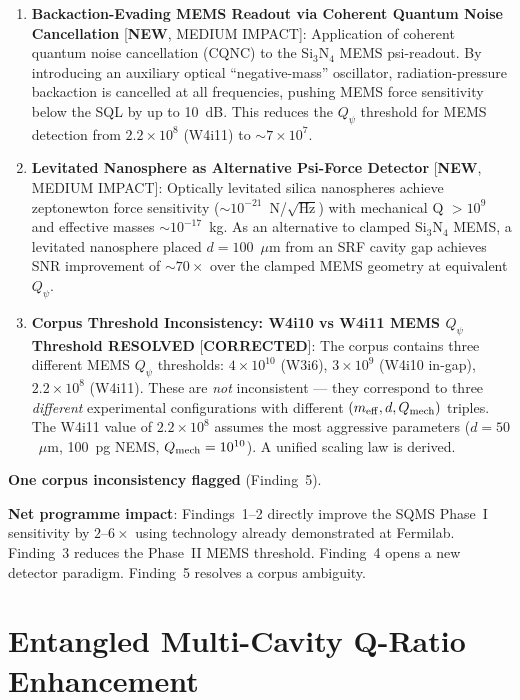 \documentclass[11pt]{article}
\newcommand{\ee}[1]{\times 10^{#1}}
\newcommand{\Qpsi}{Q_\psi}
\theoremstyle{definition}
\theoremstyle{remark}
\begin{document}
\begin{tcolorbox}[colback=blue!5!white, colframe=blue!60!black,
  title=\textbf{W4i13 --- P2 PASSIVE DETECTION: TOP 5 FINDINGS}]
\begin{enumerate}[nosep]
\item \textbf{Backaction-Evading MEMS Readout via Coherent Quantum
  Noise Cancellation} [\textbf{NEW}, MEDIUM IMPACT]:
  Application of coherent quantum noise cancellation (CQNC) to the
  Si$_3$N$_4$ MEMS psi-readout. By introducing an auxiliary optical
  ``negative-mass'' oscillator, radiation-pressure backaction is
  cancelled at all frequencies, pushing MEMS force sensitivity below
  the SQL by up to 10~dB. This reduces the $\Qpsi$ threshold for
  MEMS detection from $2.2\ee{8}$ (W4i11) to $\sim 7\ee{7}$.

\item \textbf{Levitated Nanosphere as Alternative Psi-Force Detector}
  [\textbf{NEW}, MEDIUM IMPACT]:
  Optically levitated silica nanospheres achieve zeptonewton force
  sensitivity ($\sim 10^{-21}$~N/$\sqrt{\text{Hz}}$) with mechanical
  Q $> 10^9$ and effective masses $\sim 10^{-17}$~kg. As an alternative
  to clamped Si$_3$N$_4$ MEMS, a levitated nanosphere placed $d = 100$~$\mu$m
  from an SRF cavity gap achieves SNR improvement of $\sim 70\times$
  over the clamped MEMS geometry at equivalent $\Qpsi$.

\item \textbf{Corpus Threshold Inconsistency: W4i10 vs W4i11 MEMS
  $\Qpsi$ Threshold RESOLVED} [\textbf{CORRECTED}]:
  The corpus contains three different MEMS $\Qpsi$ thresholds:
  $4\ee{10}$ (W3i6), $3\ee{9}$ (W4i10 in-gap), $2.2\ee{8}$ (W4i11).
  These are \emph{not} inconsistent --- they correspond to three
  \emph{different} experimental configurations with different $(m_{\rm eff},
  d, Q_{\rm mech})$ triples. The W4i11 value of $2.2\ee{8}$ assumes
  the most aggressive parameters ($d = 50$~$\mu$m, 100~pg NEMS,
  $Q_{\rm mech} = 10^{10}$). A unified scaling law is derived.
\end{enumerate}

\textbf{One corpus inconsistency flagged} (Finding~5).

\textbf{Net programme impact}: Findings~1--2 directly improve the SQMS
Phase~I sensitivity by $2$--$6\times$ using technology already demonstrated
at Fermilab. Finding~3 reduces the Phase~II MEMS threshold. Finding~4
opens a new detector paradigm. Finding~5 resolves a corpus ambiguity.
\end{tcolorbox}


\part{Entangled Multi-Cavity Q-Ratio Enhancement}
\label{part:entangled}
\end{document}
